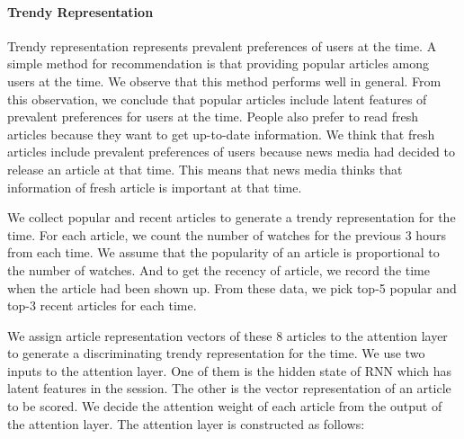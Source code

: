 \paragraph{\textbf{Trendy Representation}}
Trendy representation represents prevalent preferences of users at the time.
A simple method for recommendation is that providing popular articles among users at the time. 
We observe that this method performs well in general.
From this observation, we conclude that popular articles include latent features of prevalent preferences for users at the time.
People also prefer to read fresh articles because they want to get up-to-date information.
We think that fresh articles include prevalent preferences of users because news media had decided to release an article at that time.
This means that news media thinks that information of fresh article is important at that time.


We collect popular and recent articles to generate a trendy representation for the time.
For each article, we count the number of watches for the previous 3 hours from each time.
We assume that the popularity of an article is proportional to the number of watches. 
And to get the recency of article, we record the time when the article had been shown up. 
From these data, we pick top-5 popular and top-3 recent articles for each time.


We assign article representation vectors of these 8 articles to the attention layer to generate a discriminating trendy representation for the time.
We use two inputs to the attention layer.
One of them is the hidden state of RNN which has latent features in the session. 
The other is the vector representation of an article to be scored.
We decide the attention weight of each article from the output of the attention layer.
The attention layer is constructed as follows:

